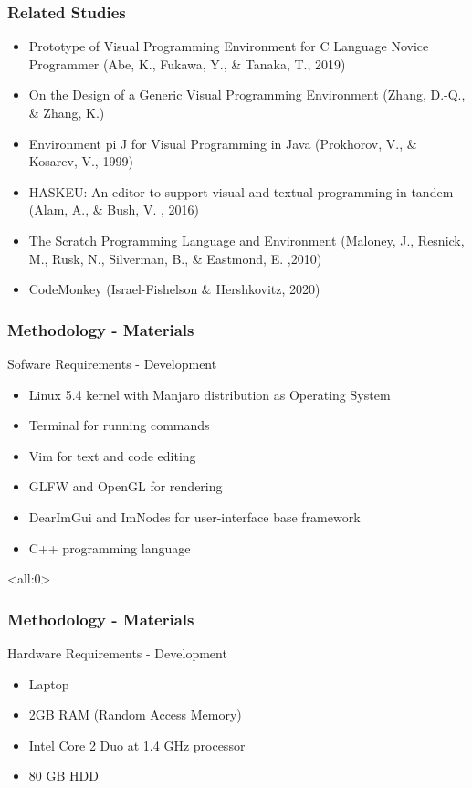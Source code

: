\documentclass{beamer}
\begin{document}
\begin{frame}
	\frametitle{Related Studies}
	\begin{itemize}
		\item<1-> Prototype of Visual Programming Environment for C Language Novice Programmer (Abe, K., Fukawa, Y., \& Tanaka, T., 2019)
		\item<2-> On the Design of a Generic Visual Programming Environment (Zhang, D.-Q., \& Zhang, K.)
		\item<3-> Environment pi J for Visual Programming in Java (Prokhorov, V., \& Kosarev, V., 1999)
		\item<4-> HASKEU: An editor to support visual and textual programming in tandem (Alam, A., \& Bush, V. , 2016)
		\item<5-> The Scratch Programming Language and Environment (Maloney, J., Resnick, M., Rusk, N., Silverman, B., \& Eastmond, E. ,2010)
		\item<6-> CodeMonkey (Israel-Fishelson \& Hershkovitz, 2020)
	\end{itemize}
\end{frame}

\begin{frame}
	\frametitle{Methodology - Materials}
	\begin{block}{Sofware Requirements - Development}
		\begin{itemize}
			\item<1-> Linux 5.4 kernel with Manjaro distribution as Operating System
			\item<2-> Terminal for running commands
			\item<3-> Vim for text and code editing
			\item<4-> GLFW and OpenGL for rendering
			\item<5-> DearImGui and ImNodes for user-interface base framework
			\item<6-> C++ programming language
		\end{itemize}
	\end{block}
\end{frame}

\begin{frame}<all:0>
	\frametitle{Methodology - Materials}
	\begin{block}{Hardware Requirements - Development}
		\begin{itemize}
			\item<1-> Laptop
			\item<2-> 2GB RAM (Random Access Memory)
			\item<3-> Intel Core 2 Duo at 1.4 GHz processor
			\item<4-> 80 GB HDD
		\end{itemize}
	\end{block}
\end{frame}
\end{document}
